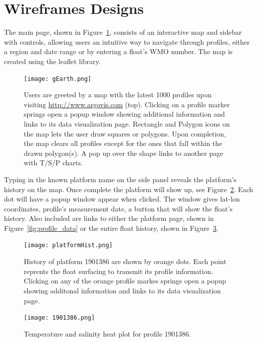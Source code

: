\section{Wireframes Designs}
The main page, shown in Figure~\ref{fig:main_page}, consists of an interactive map and sidebar with controls, allowing users an intuitive way to navigate through profiles, either a region and date range or by entering a float's WMO number. The map is created using the \gls{leaflet} library.

\begin{figure}[ht]
\begin{minipage}{6in}
\centering
\texttt{[image: gEarth.png]}
\caption{\label{fig:main_page} Users are greeted by a map with the latest 1000 profiles upon visiting \url{http://www.argovis.com} (top). Clicking on a profile marker springs open a popup window showing additional information and links to its data visualization page. Rectangle and Polygon icons on the map lets the user draw squares or polygons. Upon completion, the map clears all profiles except for the ones that fall within the drawn polygon(s). A pop up over the shape links to another page with T/S/P charts.}
\end{minipage}
\end{figure}
Typing in the known platform name on the side panel reveals the platform's history on the map. Once complete the platform will show up, see Figure~\ref{fig:prof_hist}. Each dot will have a popup window appear when clicked. The window gives lat-lon coordinates, profile's measurement date, a button that will show the float's history. Also included are links to either the platform page, shown in Figure~\ref{fig:profile_data} or the entire float history, shown in Figure~\ref{fig:platform_data}.

\begin{figure}[ht]
\centering
\begin{minipage}{6in}
\texttt{[image: platformHist.png]}
\caption{\label{fig:prof_hist} History of platform 1901386 are shown by orange dots. Each point reprents the float surfacing to transmit its profile information. Clicking on any of the orange profile markes springs open a popup showing additonal information and links to its data visualization page.}
\end{minipage}
\end{figure}

\begin{figure}[ht]
\centering
\begin{minipage}{6in}
\texttt{[image: 1901386.png]}
\caption{\label{fig:platform_data}Temperature and salinity heat plot for profile 1901386.}
\end{minipage}
\end{figure}

